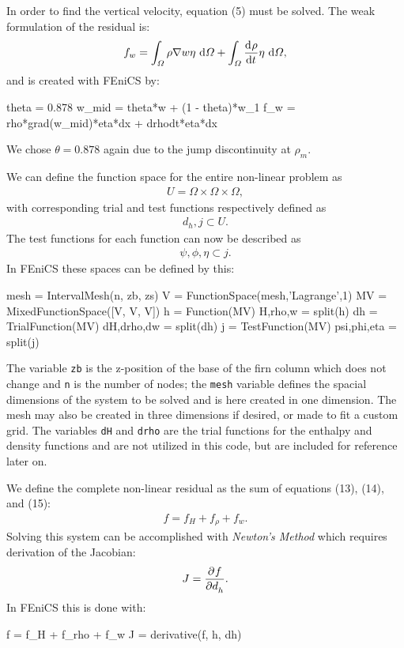 In order to find the vertical velocity, equation (5) must be solved.  The weak formulation of the residual is:
\begin{align}
  f_{w} = 
    \int_{\varOmega} \rho \nabla{w} \eta \ \mathrm{d}\varOmega + \int_{\varOmega} \frac{\mathrm{d}^{} \rho}{\mathrm{d} t^{} } \eta \ \mathrm{d}\varOmega,
\end{align}
and is created with FEniCS by:
\begin{python}
theta = 0.878
w_mid = theta*w + (1 - theta)*w_1
f_w   = rho*grad(w_mid)*eta*dx + drhodt*eta*dx
\end{python}
We chose $\theta=0.878$ again due to the jump discontinuity at $\rho_m$.

We can define the function space for the entire non-linear problem as 
\begin{align*}
    U = \Omega \times \Omega \times \Omega,
\end{align*}
with corresponding trial and test functions respectively defined as
\begin{align*}
    d_h, j \subset U.
\end{align*}
The test functions for each function can now be described as
\begin{align*}
    \psi, \phi, \eta \subset j.
\end{align*}
In FEniCS these spaces can be defined by this:
\begin{python}
mesh        = IntervalMesh(n, zb, zs)
V           = FunctionSpace(mesh,'Lagrange',1)
MV          = MixedFunctionSpace([V, V, V])
h           = Function(MV)
H,rho,w     = split(h)    
dh          = TrialFunction(MV)
dH,drho,dw  = split(dh)
j           = TestFunction(MV)
psi,phi,eta = split(j)
\end{python}
The variable \texttt{zb} is the z-position of the base of the firn column which does not change and \texttt{n} is the number of nodes; the \texttt{mesh} variable defines the spacial dimensions of the system to be solved and is here created in one dimension.  The mesh may also be created in three dimensions if desired, or made to fit a custom grid.  The variables \texttt{dH} and \texttt{drho} are the trial functions for the enthalpy and density functions and are not utilized in this code, but are included for reference later on.

We define the complete non-linear residual as the sum of equations (13), (14), and (15): 
\begin{align*}
    f = f_H + f_{\rho} + f_w.
\end{align*}
Solving this system can be accomplished with \emph{Newton's Method} which requires derivation of the Jacobian:
\begin{align*}
    J = \frac{\partial^{} f}{\partial d_h^{} }.
\end{align*}
In FEniCS this is done with:
\begin{python}
f  = f_H + f_rho + f_w
J  = derivative(f, h, dh)
\end{python}


